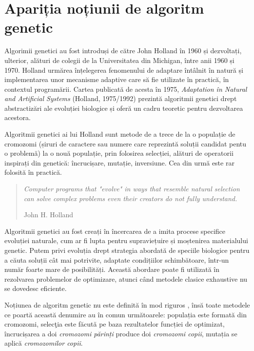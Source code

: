 \section{Apariția noțiunii de algoritm genetic} 
 
Algorimii genetici \cite{article_by_melanie_mitchell} au fost introduși de către John Holland în 1960 și dezvoltați, ulterior, alături de colegii de la Universitatea din Michigan, între anii 1960 și 1970. Holland urmărea înțelegerea fenomenului de adaptare întâlnit în natură și implementarea unor mecanisme adaptive care să fie utilizate în practică, în contextul programării. Cartea publicată de acesta în 1975, \textit{Adaptation în Natural and Artificial Systems} (Holland, 1975/1992) prezintă algoritmii genetici drept abstractizări ale evoluției biologice și oferă un cadru teoretic pentru dezvoltarea acestora.

Algoritmii genetici ai lui Holland sunt metode de a trece de la o populație de cromozomi (șiruri de caractere sau numere care reprezintă soluții candidat pentu o problemă) la o nouă populație, prin folosirea selecției, alături de operatorii inspirați din genetică: încrucișare, mutație, inversiune. Cea din urmă este rar folosită în practică.

\begin{quote} 
	\textit{Computer programs that "evolve" in ways that resemble natural selection can solve complex problems even their creators do not fully understand.}
	\begin{flushright}
		John H. Holland 
	\end{flushright}
\end{quote}

\clearpage

Algoritmii genetici au fost creați în încercarea de a imita procese specifice evoluției naturale, cum ar fi lupta pentru supraviețuire și moștenirea materialului genetic. Putem privi evoluția drept strategia abordată de speciile biologice pentru a căuta soluții cât mai potrivite, adaptate condițiilor schimbătoare, într-un număr foarte mare de posibilități. Această abordare poate fi utilizată în rezolvarea problemelor de optimizare, atunci când metodele clasice exhaustive nu se dovedesc eficiente. 
 
Noțiunea de algoritm genetic nu este definită în mod riguros \cite{introduction_by_melanie_mitchell}, însă toate metodele ce poartă această denumire au în comun următoarele: populația este formată din cromozomi, selecţia este făcută pe baza rezultatelor funcției de optimizat, încrucișarea a doi \textit{cromozomi părinți} produce doi \textit{cromozomi copii}, mutația se aplică \textit{cromozomilor copii}. 

